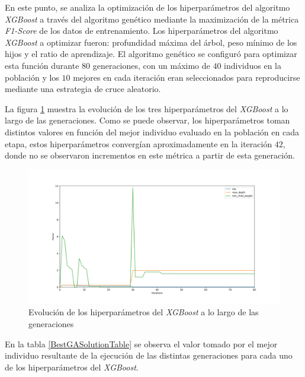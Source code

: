 
En este punto, se analiza la optimización de los hiperparámetros del algoritmo \textit{XGBoost} a través del algoritmo genético mediante la maximización de la métrica \textit{F1-Score} de los datos de entrenamiento. Los hiperparámetros del algoritmo \textit{XGBoost} a optimizar fueron: profundidad máxima del árbol, peso mínimo de los hijos y el ratio de aprendizaje. El algoritmo genético se configuró para optimizar esta función durante $80$ generaciones, con un máximo de $40$ individuos en la población y los $10$ mejores en cada iteración eran seleccionados para reproducirse mediante una estrategia de cruce aleatorio.

La figura \ref{EvolucionHiperparametrosImage} muestra la evolución de  los tres hiperparámetros del \textit{XGBoost} a lo largo de las generaciones. Como se puede observar, los hiperparámetros toman distintos valores en función del mejor individuo evaluado en la población en cada etapa, estos hiperparámetros convergían aproximadamente en la iteración $42$, donde no se observaron incrementos en este métrica a partir de esta generación.

\begin{figure}[H]
	\centering
	\includegraphics[width=14cm]{Figures/1stPaper/EvolutionH.png}
	\caption{Evolución de los hiperparámetros del \textit{XGBoost} a lo largo de las generaciones}
	\label{EvolucionHiperparametrosImage}
\end{figure}

En la tabla \ref{BestGASolutionTable} se observa el valor tomado por el mejor individuo resultante de la ejecución de las distintas generaciones para cada uno de los hiperparámetros del \textit{XGBoost}. 

